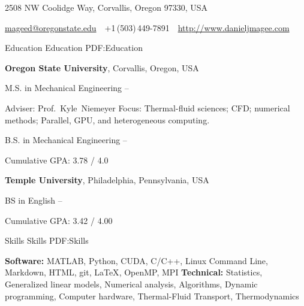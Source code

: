 \documentclass[letterpaper, MMMyyyy, nonstopmode]{simpleresumecv}
\newcommand{\CVAuthor}{Daniel J. Magee}
\newcommand{\CVWebpage}{http://www.danieljmagee.com}
\begin{document}

\Title{\CVAuthor}

\begin{SubTitle}
{2508 NW Coolidge Way, Corvallis, Oregon 97330, USA}
\par
\href{mailto:mageed@oregonstate.edu}
{mageed@oregonstate.edu}
\,\SubBulletSymbol\,
+1\,(503)\,449-7891
\,\SubBulletSymbol\,
\href{\CVWebpage}
{\url{\CVWebpage}}
\end{SubTitle}

\begin{Body}


\Section
{Education}
{Education}
{PDF:Education}

\Entry
\textbf{Oregon State University},
Corvallis, Oregon, USA

\BulletItem
M.S. in Mechanical Engineering
\hfill
{} --

\begin{Detail}
\SubBulletItem
Adviser:
Prof.~Kyle~Niemeyer
\SubBulletItem
Focus:
Thermal-fluid sciences; CFD; numerical methods; Parallel, GPU, and heterogeneous computing.
\end{Detail}

\BulletItem
B.S. in 
{Mechanical Engineering}
\hfill
{} --

\begin{Detail}
\SubBulletItem
Cumulative GPA: 3.78 / 4.0
\end{Detail}

\BigGap
\Entry
\textbf{Temple University},
Philadelphia, Pennsylvania, USA

\BulletItem
BS in English
\hfill
{} --

\begin{Detail}
\SubBulletItem
Cumulative GPA: 3.42 / 4.00
\end{Detail}


\Section
{Skills}
{Skills}
{PDF:Skills}

\Entry
\textbf{Software:} 
MATLAB,
Python,
CUDA,
C/C++,
Linux Command Line,
Markdown,
HTML,
git,
{\LaTeX},
OpenMP,
MPI
\newline
\textbf{Technical:}
Statistics, 
Generalized linear models,
Numerical analysis, 
Algorithms,
Dynamic programming,
Computer hardware,
Thermal-Fluid Transport,
Thermodynamics


\end{Body}
\end{document}
